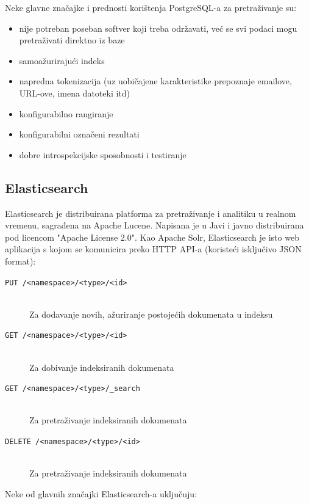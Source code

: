 \documentclass[a4paper,twoside,12pt]{scrreprt}
\begin{document}
Neke glavne značajke i prednosti korištenja PostgreSQL-a za pretraživanje su:

\begin{itemize}
  \item nije potreban poseban softver koji treba održavati, već se svi podaci mogu pretraživati direktno iz baze
  \item samoažurirajući indeks
  \item napredna tokenizacija (uz uobičajene karakteristike prepoznaje emailove, URL-ove, imena datoteki itd)
  \item konfigurabilno rangiranje
  \item konfigurabilni označeni rezultati
  \item dobre introspekcijske sposobnosti i testiranje
\end{itemize}

\subsection{Elasticsearch}

Elasticsearch je distribuirana platforma za pretraživanje i analitiku u realnom vremenu, sagrađena na Apache Lucene. Napisana je u Javi i javno distribuirana pod licencom "Apache License 2.0". Kao Apache Solr, Elasticsearch je isto web aplikacija s kojom se komunicira preko HTTP API-a (koristeći isključivo JSON format):

\begin{description}
  \item[\texttt{PUT /<namespace>/<type>/<id>}] \hfill \\ Za dodavanje novih, ažuriranje postojećih dokumenata u indeksu
  \item[\texttt{GET /<namespace>/<type>/<id>}] \hfill \\ Za dobivanje indeksiranih dokumenata
  \item[\texttt{GET /<namespace>/<type>/_search}] \hfill \\ Za pretraživanje indeksiranih dokumenata
  \item[\texttt{DELETE /<namespace>/<type>/<id>}] \hfill \\ Za pretraživanje indeksiranih dokumenata
\end{description}

Neke od glavnih značajki Elasticsearch-a uključuju:
\end{document}
